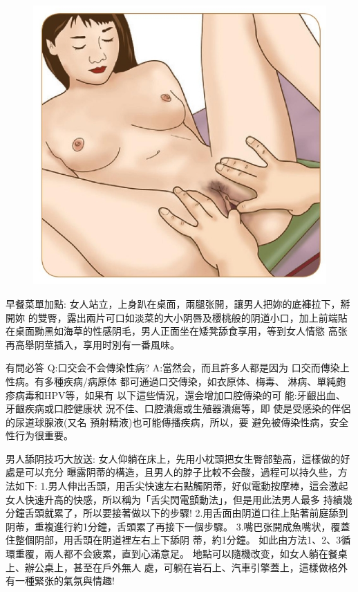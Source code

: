 \documentclass[12pt,UTF8]{ctexbook}
\begin{document}
\begin{figure}[htbp]
	\centering
	\includegraphics[width=0.7\linewidth]{23}
	\caption{}
	\label{fig:1}
\end{figure}

早餐菜單加點:
女人站立，上身趴在桌面，兩腿张開，讓男人把妳的底褲拉下，掰開妳
的雙臀，露出兩片可口如淡菜的大小阴唇及櫻桃般的阴道小口，加上前端貼
在桌面黝黑如海草的性感阴毛，男人正面坐在矮凳舔食享用，等到女人情慾
高张再高舉阴莖插入，享用时別有一番風味。

有問必答
Q:口交会不会傳染性病?
A:當然会，而且許多人都是因为
口交而傳染上性病。有多種疾病/病原体
都可通過口交傳染，如衣原体、梅毒、
淋病、單純皰疹病毒和HPV等，如果有
以下這些情況，還会增加口腔傳染的可
能:牙齦出血、牙齦疾病或口腔健康状
況不佳、口腔潰瘍或生殖器潰瘍等，即
使是受感染的伴侶的尿道球腺液(又名
預射精液)也可能傳播疾病，所以，要
避免被傳染性病，安全性行为很重要。

男人舔阴技巧大放送:
女人仰躺在床上，先用小枕頭把女生臀部墊高，這樣做的好處是可以充分
曝露阴蒂的構造，且男人的脖子比較不会酸，過程可以持久些，方法如下:
1.男人伸出舌頭，用舌尖快速左右點觸阴蒂，好似電動按摩棒，這会激起
女人快速升高的快感，所以稱为「舌尖閃電顫動法」，但是用此法男人最多
持續幾分鐘舌頭就累了，所以要接著做以下的步驟!
2.用舌面由阴道口往上貼著前庭舔到阴蒂，重複進行約1分鐘，舌頭累了再接下一個步驟。
3.嘴巴张開成魚嘴状，覆蓋住整個阴部，用舌頭在阴道裡左右上下舔阴
蒂，約1分鐘。
如此由方法1、2、3循環重覆，兩人都不会疲累，直到心滿意足。
地點可以隨機改变，如女人躺在餐桌上、辦公桌上，甚至在戶外無人
處，可躺在岩石上、汽車引擎蓋上，這樣做格外有一種緊张的氣氛與情趣!
\end{document}
